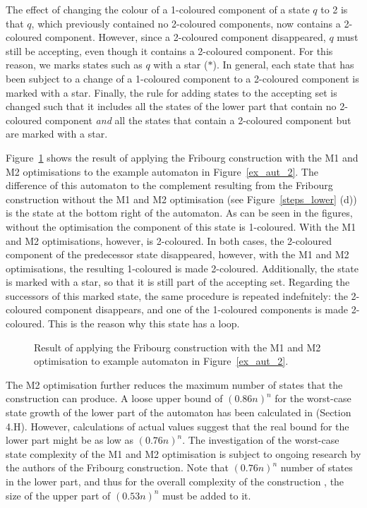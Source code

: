 The effect of changing the colour of a 1-coloured component of a state $q$ to 2 is that $q$, which previously contained no 2-coloured  components, now contains a 2-coloured component. However, since a 2-coloured component disappeared, $q$ must still be accepting, even though it contains a 2-coloured component. For this reason, we marks states such as $q$ with a star ($*$). In general, each state that has been subject to a change of a 1-coloured component to a 2-coloured component is marked with a star. Finally, the rule for adding states to the accepting set is changed such that it includes all the states of the lower part that contain no 2-coloured component \textit{and} all the states that contain a 2-coloured component but are marked with a star.


Figure~\ref{complement_with_m2} shows the result of applying the Fribourg construction with the M1 and M2 optimisations to the example automaton in Figure~\ref{ex_aut_2}. The difference of this automaton to the complement resulting from the Fribourg construction without the M1 and M2 optimisation (see Figure~\ref{steps_lower} (d)) is the state at the bottom right of the automaton. As can be seen in the figures, without the optimisation the component  of this state is 1-coloured. With the M1 and M2 optimisations, however,  is 2-coloured. In both cases, the 2-coloured component of the predecessor state disappeared, however, with the M1 and M2 optimisations, the resulting 1-coloured  is made 2-coloured. Additionally, the state is marked with a star, so that it is still part of the accepting set. Regarding the successors of this marked state, the same procedure is repeated indefnitely: the 2-coloured component disappears, and one of the 1-coloured components is made 2-coloured. This is the reason why this state has a loop.

\begin{figure}[htb]
\centering
\ComplementWithMTwo
\caption{Result of applying the Fribourg construction with the M1 and M2 optimisation to example automaton in Figure~\ref{ex_aut_2}.}
\label{complement_with_m2}
\end{figure}

The M2 optimisation further reduces the maximum number of states that the construction can produce. A loose upper bound of $(0.86n)^n$ for the worst-case state growth of the lower part of the automaton has been calculated in \cite{2014_joel_ulrich} (Section 4.H). However, calculations of actual values suggest that the real bound for the lower part might be as low as $(0.76n)^n$. The investigation of the worst-case state complexity of the M1 and M2 optimisation is subject to ongoing research by the authors of the Fribourg construction. Note that $(0.76n)^n$ number of states in the lower part, and thus for the overall complexity of the construction , the size of the upper part of $(0.53n)^n$ must be added to it.


